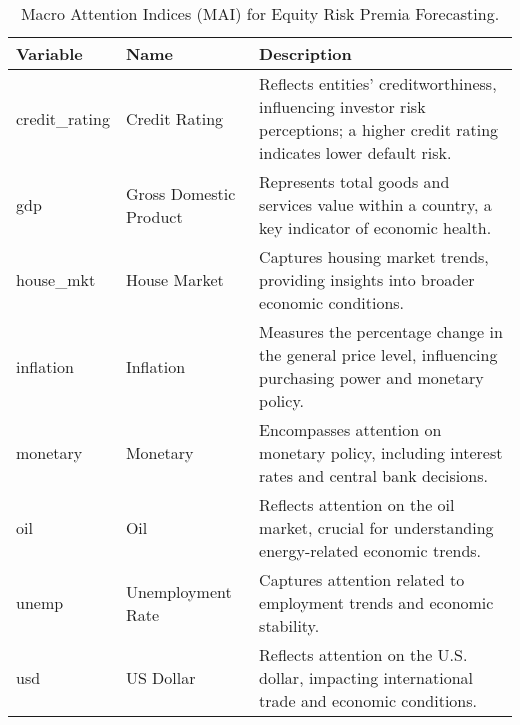 \begin{table}[H]
  \centering
  \begin{tabular}{|l|l|p{7.5cm}|}
  \hline
  \textbf{Variable} & \textbf{Name} & \textbf{Description} \\
  \hline
  credit\_rating & Credit Rating & Reflects entities' creditworthiness, influencing investor risk perceptions; a higher credit rating indicates lower default risk. \\
  gdp & Gross Domestic Product & Represents total goods and services value within a country, a key indicator of economic health. \\
  house\_mkt & House Market & Captures housing market trends, providing insights into broader economic conditions. \\
  inflation & Inflation & Measures the percentage change in the general price level, influencing purchasing power and monetary policy. \\
  monetary & Monetary & Encompasses attention on monetary policy, including interest rates and central bank decisions. \\
  oil & Oil & Reflects attention on the oil market, crucial for understanding energy-related economic trends. \\
  unemp & Unemployment Rate & Captures attention related to employment trends and economic stability. \\
  usd & US Dollar & Reflects attention on the U.S. dollar, impacting international trade and economic conditions. \\
  \hline
  \end{tabular}
  \caption{Macro Attention Indices (MAI) for Equity Risk Premia Forecasting.}
  \label{tab:MAI}
  \end{table}